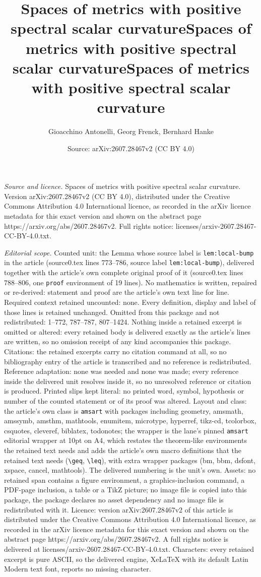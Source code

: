 \documentclass[10pt,a4paper]{amsart}
\title{Spaces of metrics with positive spectral scalar curvature}
\title{Spaces of metrics with positive spectral scalar curvature}
\title[Spaces of metrics with positive spectral scalar curvature]{Spaces of metrics with positive spectral scalar curvature}
\author{Gioacchino Antonelli, Georg Frenck, Bernhard Hanke}
\date{Source: arXiv:2607.28467v2 (CC BY 4.0)}
\begin{document}
\maketitle

\noindent\emph{Source and licence.} Spaces of metrics with positive spectral scalar curvature. Version arXiv:2607.28467v2 (CC BY 4.0), distributed under the Creative Commons Attribution 4.0 International licence, as recorded in the arXiv licence metadata for this exact version and shown on the abstract page https://arxiv.org/abs/2607.28467v2. Full rights notice: licenses/arxiv-2607.28467-CC-BY-4.0.txt.\par\smallskip

\noindent\textit{Editorial scope.} Counted unit: the Lemma whose source label is \texttt{lem:local-bump} in the article (source0.tex lines 773--786, source label \texttt{lem:local-bump}), delivered together with the article's own complete original proof of it (source0.tex lines 788--806, one \texttt{proof} environment of 19 lines). No mathematics is written, repaired or re-derived: statement and proof are the article's own text line for line. Required context retained uncounted: none. Every definition, display and label of those lines is retained unchanged. Omitted from this package and not redistributed: 1--772, 787--787, 807--1424. Nothing inside a retained excerpt is omitted or altered: every retained body is delivered exactly as the article's lines are written, so no omission receipt of any kind accompanies this package. Citations: the retained excerpts carry no citation command at all, so no bibliography entry of the article is transcribed and no reference is redistributed. Reference adaptation: none was needed and none was made; every reference inside the delivered unit resolves inside it, so no unresolved reference or citation is produced. Printed slips kept literal: no printed word, symbol, hypothesis or number of the counted statement or of its proof was altered. Layout and class: the article's own class is \texttt{amsart} with packages including geometry, amsmath, amssymb, amsthm, mathtools, enumitem, microtype, hyperref, tikz-cd, tcolorbox, csquotes, cleveref, biblatex, todonotes; the wrapper is the lane's pinned \texttt{amsart} editorial wrapper at 10pt on A4, which restates the theorem-like environments the retained text needs and adds the article's own macro definitions that the retained text needs (\texttt{\textbackslash geq}, \texttt{\textbackslash leq}), with extra wrapper packages (bm, bbm, dsfont, xspace, cancel, mathtools). The delivered numbering is the unit's own. Assets: no retained span contains a figure environment, a graphics-inclusion command, a PDF-page inclusion, a table or a TikZ picture; no image file is copied into this package, the package declares no asset dependency and no image file is redistributed with it. Licence: version arXiv:2607.28467v2 of this article is distributed under the Creative Commons Attribution 4.0 International licence, as recorded in the arXiv licence metadata for this exact version and shown on the abstract page https://arxiv.org/abs/2607.28467v2. A full rights notice is delivered at licenses/arxiv-2607.28467-CC-BY-4.0.txt. Characters: every retained excerpt is pure ASCII, so the delivered engine, XeLaTeX with its default Latin Modern text font, reports no missing character.
\end{document}
